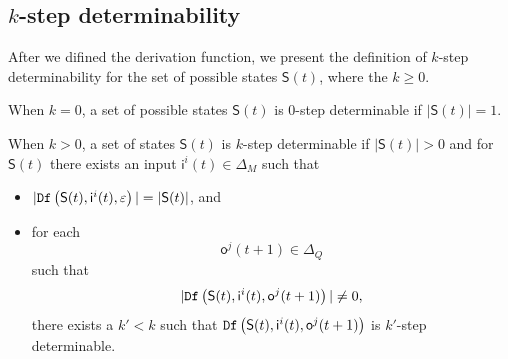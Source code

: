 \subsection{$k$-step determinability}
After we difined the derivation function, we present the definition of $k$-step determinability for the set of possible states $\mathsf{S}(t)$, where the $k\ge 0$. %
\begin{definition} 

When $k=0$, a set of possible states $\mathsf{S}(t)$ is $0$-step determinable if $|\mathsf{S}(t)|=1$. 

When $k>0$, a set of states $\mathsf{S}(t)$ is $k$-step determinable
 if $|\mathsf{S}(t)|>0$ and for $\mathsf{S}(t)$ there exists an input $\mathsf{i}^{i}(t) \in \Delta_M$ such that
 \begin{itemize}
 \item  $|{\tt Df}\left(\mathsf{S}(t),\mathsf{i}^{i}(t),\varepsilon\right)|=|\mathsf{S}(t)|$, and 
 \item  for each \[\mathsf{o}^{j}(t+1)\in \Delta_Q\] such that \[|{\tt Df}\left(\mathsf{S}(t),\mathsf{i}^{i}(t),\mathsf{o}^{j}(t+1)\right)|\neq 0,\] there exists a ${k'}<k$ such that ${\tt Df}\left(\mathsf{S}(t),\mathsf{i}^{i}(t),\mathsf{o}^{j}(t+1)\right)$ is $k'$-step determinable.
 \end{itemize}
\end{definition}

